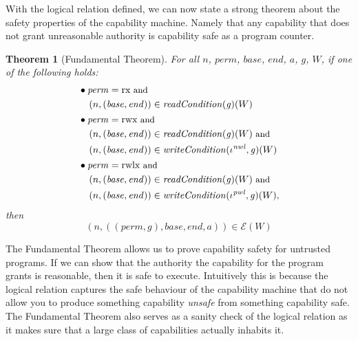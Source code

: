 \documentclass[compsoc,conference,letterpaper,fleqn]{IEEEtran}
\newtheorem{theorem}{Theorem}
\newcommand{\var}[1]{\mathit{#1}}
\newcommand{\gl}{\var{g}}
\newcommand{\addr}{\var{a}}
\newcommand{\start}{\var{base}}
\newcommand{\addrend}{\var{end}}
\newcommand{\perm}{\var{perm}}
\newcommand{\nwl}{\var{nwl}}
\newcommand{\pwl}{\var{pwl}}
\newcommand{\plainfun}[2]{
  \ifthenelse{\equal{#2}{}}
  {\mathit{#1}}
  {\mathit{#1}(#2)}
}
\newcommand{\readCond}[1]{\plainfun{readCondition}{#1}}
\newcommand{\writeCond}[1]{\plainfun{writeCondition}{#1}}
\newcommand{\asmType}{\plaindom{AsmType}}
\newcommand{\plaindom}[1]{\mathrm{#1}}
\newcommand{\intr}[2]{\mathcal{#1}}
\newcommand{\exprintr}[1]{\intr{E}{#1}}
\newcommand{\stder}{\exprintr{\asmType}}
\newcommand{\npair}[2][n]{\left(#1,#2 \right)}
\newcommand{\plainperm}[1]{\mathrm{#1}}
\newcommand{\exec}{\plainperm{rx}}
\newcommand{\rwx}{\plainperm{rwx}}
\newcommand{\rwlx}{\plainperm{rwlx}}
\begin{document}
With the logical relation defined, we can now state a strong theorem
about the safety properties of the capability machine. Namely that any
capability that does not grant unreasonable authority is capability
safe as a program counter.
\begin{theorem}[Fundamental Theorem]
  \label{thm:ftlr}
  For all $n$, $\perm$, $\start$, $\addrend$, $\addr$, $\gl$, $W$, if one of the following holds:
  \begin{align*}
      & \bullet
        \begin{aligned}[t]
        &\perm = \exec \text{\footnotesize{ and }}\\
        &\npair{(\start,\addrend)} \in \readCond{}(\gl)(W)
      \end{aligned} \\
    & \bullet 
      \begin{aligned}[t]
        &\perm = \rwx \text{\footnotesize{ and }} \\
        &\npair{(\start,\addrend)} \in \readCond{}(\gl)(W) \text{\footnotesize{ and }}\\
        &\npair{(\start,\addrend)} \in \writeCond{}(\iota^\nwl,\gl)(W)
      \end{aligned} \\
    & \bullet 
      \begin{aligned}[t]
        &\perm = \rwlx \text{\footnotesize{ and }}\\
        &\npair{(\start,\addrend)} \in \readCond{}(\gl)(W) \text{\footnotesize{ and }}\\
        &\npair{(\start,\addrend)} \in \writeCond{}(\iota^\pwl,\gl)(W),
      \end{aligned}
  \end{align*}
  then
  \[
    \npair{((\perm,\gl),\start,\addrend,\addr)} \in \stder(W)
  \]
\end{theorem}
The Fundamental Theorem allows us to prove capability safety for
untrusted programs. If we can show that the authority the capability
for the program grants is reasonable, then it is safe to
execute. Intuitively this is because the logical relation captures the
safe behaviour of the capability machine that do not allow you to
produce something capability \emph{unsafe} from something capability
safe. The Fundamental Theorem also serves as a sanity check of the
logical relation as it makes sure that a large class of capabilities
actually inhabits it.

\end{document}
